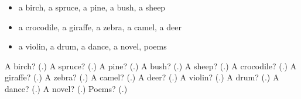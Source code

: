 \begin{itemize}
\raggedright
  \item a birch, a spruce, a pine, a bush, a sheep
  \item a crocodile, a giraffe, a zebra, a camel, a deer
  \item a violin, a drum, a dance, a novel, poems
\end{itemize}

\begin{tcolorbox}[breakable,colback=teal!4,colframe=teal!35!black,title={Before you move on}]
A birch? (\textbf{}.) A spruce? (\textbf{}.) A pine? (\textbf{}.) A bush? (\textbf{}.) A sheep? (\textbf{}.) A crocodile? (\textbf{}.) A giraffe? (\textbf{}.) A zebra? (\textbf{}.) A camel? (\textbf{}.) A deer? (\textbf{}.) A violin? (\textbf{}.) A drum? (\textbf{}.) A dance? (\textbf{}.) A novel? (\textbf{}.) Poems? (\textbf{}.)
\end{tcolorbox}
